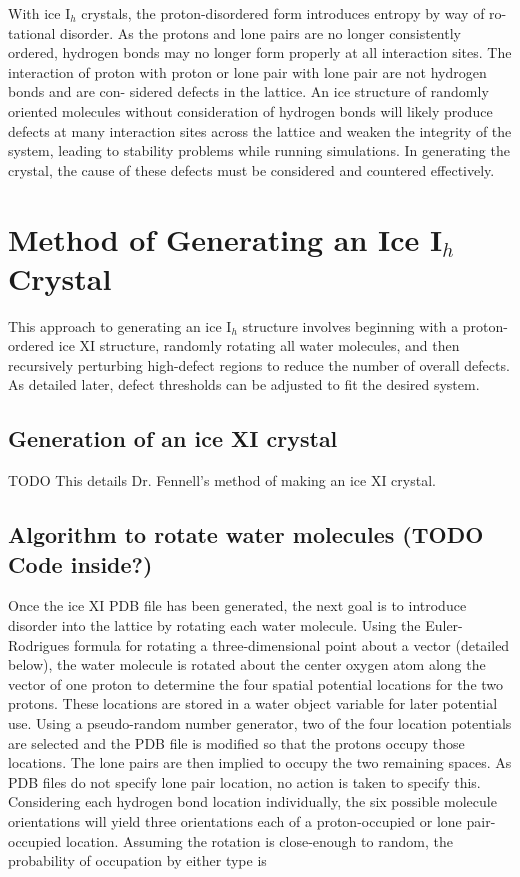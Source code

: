 With ice I$_{h}$ crystals, the proton-disordered form introduces entropy by way of ro- tational disorder. 
As the protons and lone pairs are no longer consistently ordered, hydrogen bonds may no longer form properly at all interaction sites. 
The interaction of proton with proton or lone pair with lone pair are not hydrogen bonds and are con- sidered defects in the lattice. 
An ice structure of randomly oriented molecules without consideration of hydrogen bonds will likely produce defects at many interaction sites across the lattice and weaken the integrity of the system, leading to stability problems while running simulations. 
In generating the crystal, the cause of these defects must be considered and countered effectively.

\section{Method of Generating an Ice I$_{h}$ Crystal}
This approach to generating an ice I$_{h}$ structure involves beginning with a proton- ordered ice XI structure, randomly rotating all water molecules, and then recursively perturbing high-defect regions to reduce the number of overall defects. 
As detailed later, defect thresholds can be adjusted to fit the desired system.
\subsection{Generation of an ice XI crystal}
TODO
This details Dr. Fennell’s method of making an ice XI crystal.
\subsection{Algorithm to rotate water molecules (TODO Code inside?)}
Once the ice XI PDB file has been generated, the next goal is to introduce disorder into the lattice by rotating each water molecule. 
Using the Euler-Rodrigues formula for rotating a three-dimensional point about a vector (detailed below), the water molecule is rotated about the center oxygen atom along the vector of one proton to determine the four spatial potential locations for the two protons. 
These locations are stored in a water object variable for later potential use.
Using a pseudo-random number generator, two of the four location potentials are selected and the PDB file is modified so that the protons occupy those locations. 
The lone pairs are then implied to occupy the two remaining spaces. 
As PDB files do not specify lone pair location, no action is taken to specify this. 
Considering each hydrogen bond location individually, the six possible molecule orientations will yield three orientations each of a proton-occupied or lone pair-occupied location. 
Assuming the rotation is close-enough to random, the probability of occupation by either type is 

